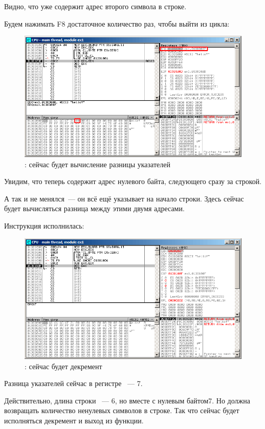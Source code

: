 Видно, что \EAX уже содержит адрес второго символа в строке.

\clearpage
Будем нажимать F8 достаточное количество раз, чтобы выйти из цикла:

\begin{figure}[H]
\centering
\includegraphics[scale=\FigScale]{patterns/10_strings/1_strlen/olly3.png}
\caption{\olly: сейчас будет вычисление разницы указателей}
\label{fig:strlen_olly_3}
\end{figure}

Увидим, что \EAX теперь содержит адрес нулевого байта, следующего сразу за строкой.

А \EDX так и не менялся~--- он всё ещё указывает на начало строки.
Здесь сейчас будет вычисляться разница между этими двумя адресами.

\clearpage
Инструкция \SUB исполнилась:

\begin{figure}[H]
\centering
\includegraphics[scale=\FigScale]{patterns/10_strings/1_strlen/olly4.png}
\caption{\olly: сейчас будет декремент \EAX}
\label{fig:strlen_olly_4}
\end{figure}

Разница указателей сейчас в регистре \EAX~--- 7.

Действительно, длина строки ~--- 6, 
но вместе с нулевым байтом\EMDASH{}7.
Но  должна возвращать количество ненулевых символов в строке.
Так что сейчас будет исполняться декремент и выход из функции.


